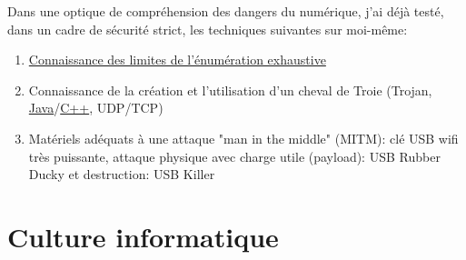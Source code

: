 \documentclass{article}
\begin{document}
		Dans une optique de compréhension des dangers du numérique, j'ai déjà testé, dans un cadre de sécurité strict, les techniques suivantes sur moi-même:
		
		\begin{enumerate}
		
			\item \href{https://github.com/Benjamin-Loison/Lot-of-Java-projects/tree/master/BruteForce\%20HTTP\%20Auth}{Connaissance des limites de l'énumération exhaustive}
			\item Connaissance de la création et l'utilisation d'un cheval de Troie (Trojan, \href{https://github.com/Benjamin-Loison/Lot-of-Java-projects/tree/master/TrojanServer}{Java}/\href{https://github.com/Benjamin-Loison/Trojan}{C++}, UDP/TCP)
			\item Matériels adéquats à une attaque "man in the middle" (MITM): clé USB wifi très puissante, attaque physique avec charge utile (payload): USB Rubber Ducky et destruction: USB Killer
		
		\end{enumerate}

	\section{Culture informatique}
\end{document}
